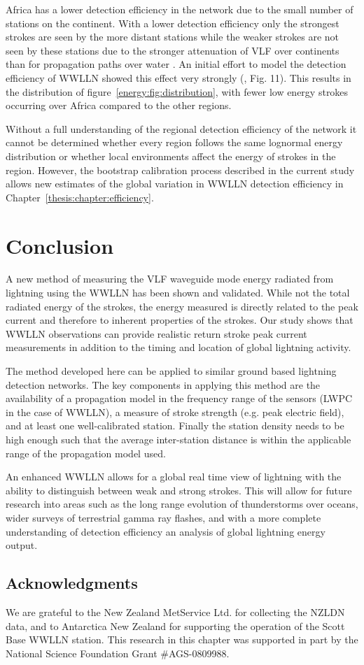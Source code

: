 Africa has a lower detection efficiency in the network due to the small number of stations on the continent.
With a lower detection efficiency only the strongest strokes are seen by the more distant stations while the weaker strokes are not seen by these stations due to the stronger attenuation of VLF over continents than for propagation paths over water \citep{Wait1970}.
An initial effort to model the detection efficiency of WWLLN showed this effect very strongly (\citet{Rodger2006}, Fig. 11).
This results in the distribution of figure~\ref{energy:fig:distribution}, with fewer low energy strokes occurring over Africa compared to the other regions.

Without a full understanding of the regional detection efficiency of the network it cannot be determined whether every region follows the same lognormal energy distribution or whether local environments affect the energy of strokes in the region.
However, the bootstrap calibration process described in the current study allows new estimates of the global variation in WWLLN detection efficiency in Chapter~\ref{thesis:chapter:efficiency}.

\section{Conclusion}

A new method of measuring the VLF waveguide mode energy radiated from lightning using the WWLLN has been shown and validated.
While not the total radiated energy of the strokes, the energy measured is directly related to the peak current and therefore to inherent properties of the strokes.
Our study shows that WWLLN observations can provide realistic return stroke peak current measurements in addition to the timing and location of global lightning activity.

The method developed here can be applied to similar ground based lightning detection networks.
The key components in applying this method are the availability of a propagation model in the frequency range of the sensors (LWPC in the case of WWLLN), a measure of stroke strength (e.g. peak electric field), and at least one well-calibrated station.
Finally the station density needs to be high enough such that the average inter-station distance is within the applicable range of the propagation model used.

An enhanced WWLLN allows for a global real time view of lightning with the ability to distinguish between weak and strong strokes.
This will allow for future research into areas such as the long range evolution of thunderstorms over oceans, wider surveys of terrestrial gamma ray flashes, and with a more complete understanding of detection efficiency an analysis of global lightning energy output.

\subsection*{Acknowledgments} 
We are grateful to the New Zealand MetService Ltd. for collecting the NZLDN data, and to Antarctica New Zealand for supporting the operation of the Scott Base WWLLN station.
This research in this chapter was supported in part by the National Science Foundation Grant \#AGS-0809988.
